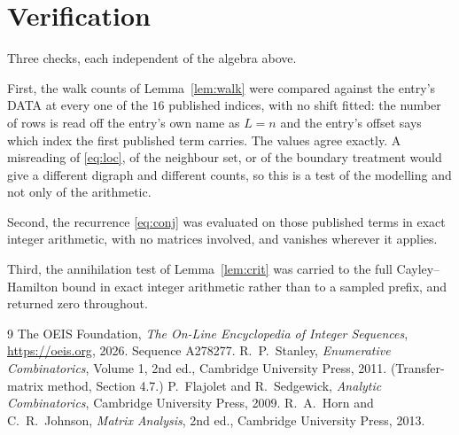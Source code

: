 \documentclass[11pt,a4paper]{article}
\theoremstyle{plain}
\theoremstyle{definition}
\begin{document}
\section{Verification}

Three checks, each independent of the algebra above.

First, the walk counts of Lemma~\ref{lem:walk} were compared against the entry's DATA at
every one of the $16$ published indices, with no shift fitted: the number of rows is
read off the entry's own name as $L=n$ and the entry's offset says which index the first
published term carries. The values agree exactly. A misreading of \eqref{eq:loc}, of the
neighbour set, or of the boundary treatment would give a different digraph and different
counts, so this is a test of the modelling and not only of the arithmetic.

Second, the recurrence \eqref{eq:conj} was evaluated on those published terms in exact
integer arithmetic, with no matrices involved, and vanishes wherever it applies.

Third, the annihilation test of Lemma~\ref{lem:crit} was carried to the full
Cayley--Hamilton bound in exact integer arithmetic rather than to a sampled prefix, and
returned zero throughout.

\begin{thebibliography}{9}
 The OEIS Foundation, \emph{The On-Line Encyclopedia of Integer
Sequences}, \url{https://oeis.org}, 2026. Sequence A278277.
 R.~P.~Stanley, \emph{Enumerative Combinatorics}, Volume 1, 2nd ed.,
Cambridge University Press, 2011. (Transfer-matrix method, Section 4.7.)
 P.~Flajolet and R.~Sedgewick, \emph{Analytic Combinatorics}, Cambridge
University Press, 2009.
 R.~A.~Horn and C.~R.~Johnson, \emph{Matrix Analysis}, 2nd ed., Cambridge
University Press, 2013.
\end{thebibliography}
\end{document}

